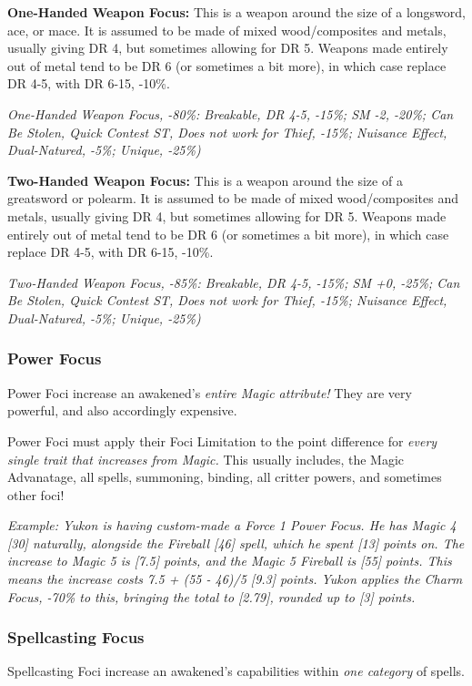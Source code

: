 \begin{multicols*}{2}
	\textbf{One-Handed Weapon Focus:} This is a weapon around the size of a longsword, ace, or mace. It is assumed to be made of mixed wood/composites and metals, usually giving DR 4, but sometimes allowing for DR 5. Weapons made entirely out of metal tend to be DR 6 (or sometimes a bit more), in which case replace DR 4-5, with DR 6-15, -10\%.
	
	\textcolor{OliveGreen}{\textit{One-Handed Weapon Focus, -80\%: Breakable, DR 4-5, -15\%; SM -2, -20\%; Can Be Stolen, Quick Contest ST, Does not work for Thief, -15\%; Nuisance Effect, Dual-Natured, -5\%; Unique, -25\%)}}
	
	\textbf{Two-Handed Weapon Focus:} This is a weapon around the size of a greatsword or polearm. It is assumed to be made of mixed wood/composites and metals, usually giving DR 4, but sometimes allowing for DR 5. Weapons made entirely out of metal tend to be DR 6 (or sometimes a bit more), in which case replace DR 4-5, with DR 6-15, -10\%.
	
	\textcolor{OliveGreen}{\textit{Two-Handed Weapon Focus, -85\%: Breakable, DR 4-5, -15\%; SM +0, -25\%; Can Be Stolen, Quick Contest ST, Does not work for Thief, -15\%; Nuisance Effect, Dual-Natured, -5\%; Unique, -25\%)}}
	
	\subsubsection{Power Focus} Power Foci increase an awakened's \textit{entire Magic attribute!} They are very powerful, and also accordingly expensive.
	
	Power Foci must apply their Foci Limitation to the point difference for \textit{every single trait that increases from Magic.} This usually includes, the Magic Advanatage, all spells, summoning, binding, all critter powers, and sometimes other foci!
	
	\textcolor{OliveGreen}{\textit{Example: Yukon is having custom-made a Force 1 Power Focus. He has Magic 4 [30] naturally, alongside the Fireball [46] spell, which he spent [13] points on. The increase to Magic 5 is [7.5] points, and the Magic 5 Fireball is [55] points. This means the increase costs 7.5 + (55 - 46)/5 [9.3] points. Yukon applies the Charm Focus, -70\% to this, bringing the total to [2.79], rounded up to [3] points.}}
	
	\subsubsection{Spellcasting Focus} Spellcasting Foci increase an awakened's capabilities within \textit{one category} of spells.
	

\end{multicols*}
